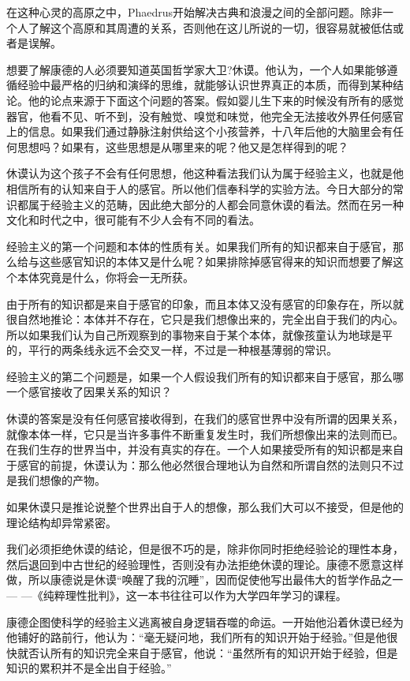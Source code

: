 \documentclass[UTF8]{article}
\begin{document}
\par 在这种心灵的高原之中，Phaedrus开始解决古典和浪漫之间的全部问题。除非一个人了解这个高原和其周遭的关系，否则他在这儿所说的一切，很容易就被低估或者是误解。
\par 想要了解康德的人必须要知道英国哲学家大卫?休谟。他认为，一个人如果能够遵循经验中最严格的归纳和演绎的思维，就能够认识世界真正的本质，而得到某种结论。他的论点来源于下面这个问题的答案。假如婴儿生下来的时候没有所有的感觉器官，他看不见、听不到，没有触觉、嗅觉和味觉，他完全无法接收外界任何感官上的信息。如果我们通过静脉注射供给这个小孩营养，十八年后他的大脑里会有任何思想吗？如果有，这些思想是从哪里来的呢？他又是怎样得到的呢？
\par 休谟认为这个孩子不会有任何思想，他这种看法我们认为属于经验主义，也就是他相信所有的认知来自于人的感官。所以他们信奉科学的实验方法。今日大部分的常识都属于经验主义的范畴，因此绝大部分的人都会同意休谟的看法。然而在另一种文化和时代之中，很可能有不少人会有不同的看法。
\par 经验主义的第一个问题和本体的性质有关。如果我们所有的知识都来自于感官，那么给与这些感官知识的本体又是什么呢？如果排除掉感官得来的知识而想要了解这个本体究竟是什么，你将会一无所获。
\par 由于所有的知识都是来自于感官的印象，而且本体又没有感官的印象存在，所以就很自然地推论：本体并不存在，它只是我们想像出来的，完全出自于我们的内心。所以如果我们认为自己所观察到的事物来自于某个本体，就像孩童认为地球是平的，平行的两条线永远不会交叉一样，不过是一种根基薄弱的常识。
\par 经验主义的第二个问题是，如果一个人假设我们所有的知识都来自于感官，那么哪一个感官接收了因果关系的知识？
\par 休谟的答案是没有任何感官接收得到，在我们的感官世界中没有所谓的因果关系，就像本体一样，它只是当许多事件不断重复发生时，我们所想像出来的法则而已。在我们生存的世界当中，并没有真实的存在。一个人如果接受所有的知识都是来自于感官的前提，休谟认为：那么他必然很合理地认为自然和所谓自然的法则只不过是我们想像的产物。
\par 如果休谟只是推论说整个世界出自于人的想像，那么我们大可以不接受，但是他的理论结构却异常紧密。
\par 我们必须拒绝休谟的结论，但是很不巧的是，除非你同时拒绝经验论的理性本身，然后退回到中古世纪的经验理性，否则没有办法拒绝休谟的理论。康德不愿意这样做，所以康德说是休谟“唤醒了我的沉睡”，因而促使他写出最伟大的哲学作品之一— —《纯粹理性批判》，这一本书往往可以作为大学四年学习的课程。
\par 康德企图使科学的经验主义逃离被自身逻辑吞噬的命运。一开始他沿着休谟已经为他铺好的路前行，他认为：“毫无疑问地，我们所有的知识开始于经验。”但是他很快就否认所有的知识完全来自于感官，他说：“虽然所有的知识开始于经验，但是知识的累积并不是全出自于经验。”
\end{document}
